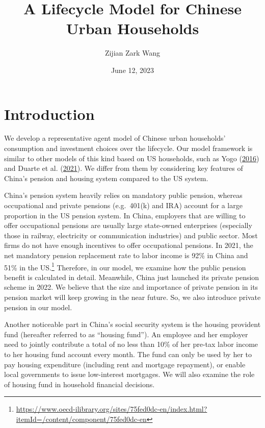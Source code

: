 \documentclass[
  12pt,
]{article}
\title{A Lifecycle Model for Chinese Urban Households}
\author{Zijian Zark Wang}
\date{June 12, 2023}
\begin{document}
\maketitle

\hypertarget{introduction}{%
\section{Introduction}\label{introduction}}

We develop a representative agent model of Chinese urban households'
consumption and investment choices over the lifecycle. Our model
framework is similar to other models of this kind based on US
households, such as Yogo
(\protect\hyperlink{ref-yogo_portfolio_2016}{2016}) and Duarte et al.
(\protect\hyperlink{ref-duarte_simple_2021}{2021}). We differ from them
by considering key features of China's pension and housing system
compared to the US system.

China's pension system heavily relies on mandatory public pension,
whereas occupational and private pensions (e.g.~401(k) and IRA) account
for a large proportion in the US pension system. In China, employers
that are willing to offer occupational pensions are usually large
state-owned enterprises (especially those in railway, electricity or
communication industries) and public sector. Most firms do not have
enough incentives to offer occupational pensions. In 2021, the net
mandatory pension replacement rate to labor income is 92\% in China and
51\% in the US.\footnote{\url{https://www.oecd-ilibrary.org/sites/75fed0dc-en/index.html?itemId=/content/component/75fed0dc-en}}
Therefore, in our model, we examine how the public pension benefit is
calculated in detail. Meanwhile, China just launched its private pension
scheme in 2022. We believe that the size and importance of private
pension in its pension market will keep growing in the near future. So,
we also introduce private pension in our model.

Another noticeable part in China's social security system is the housing
provident fund (hereafter referred to as ``housing fund''). An employee
and her employer need to jointly contribute a total of no less than 10\%
of her pre-tax labor income to her housing fund account every month. The
fund can only be used by her to pay housing expenditure (including rent
and mortgage repayment), or enable local governments to issue
low-interest mortgages. We will also examine the role of housing fund in
household financial decisions.
\end{document}

